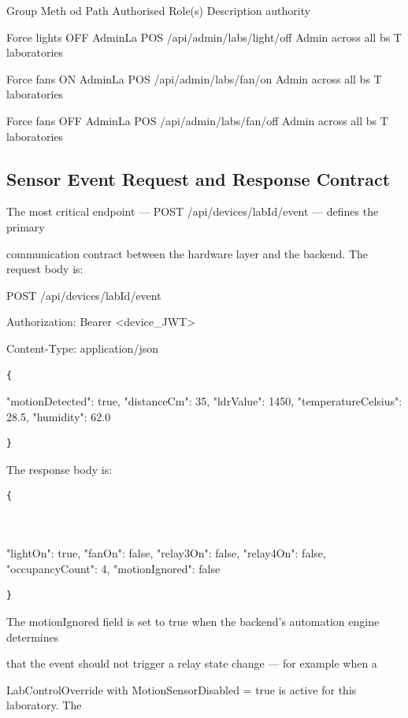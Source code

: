 Group Meth
od Path Authorised
Role(s) Description
authority

Force lights OFF
AdminLa POS
/api/admin/labs/light/off Admin across all
bs T
laboratories

Force fans ON
AdminLa POS
/api/admin/labs/fan/on Admin across all
bs T
laboratories

Force fans OFF
AdminLa POS
/api/admin/labs/fan/off Admin across all
bs T
laboratories


\subsection{Sensor Event Request and Response Contract}


The most critical endpoint --- POST /api/devices/{labId}/event --- defines the primary

communication contract between the hardware layer and the backend. The request body
is:

POST /api/devices/{labId}/event

Authorization: Bearer <device_JWT>

Content-Type: application/json

\begin{lstlisting}
{

\end{lstlisting}

"motionDetected": true,
"distanceCm": 35,
"ldrValue": 1450,
"temperatureCelsius": 28.5,
"humidity": 62.0
\begin{lstlisting}
}

\end{lstlisting}

The response body is:

\begin{lstlisting}
{



\end{lstlisting}

"lightOn": true,
"fanOn": false,
"relay3On": false,
"relay4On": false,
"occupancyCount": 4,
"motionIgnored": false
\begin{lstlisting}
}

\end{lstlisting}

The motionIgnored field is set to true when the backend's automation engine determines

that the event should not trigger a relay state change --- for example when a

LabControlOverride with MotionSensorDisabled = true is active for this laboratory. The

